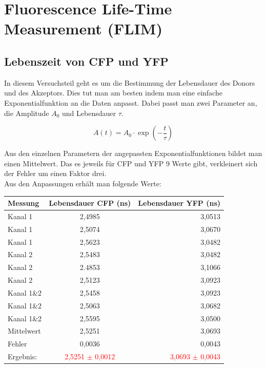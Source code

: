 \section{Fluorescence Life-Time Measurement (FLIM)}

\subsection{Lebenszeit von CFP und YFP}

In diesem Versuchsteil geht es um die Bestimmung der Lebensdauer des Donors und des Akzeptors. Dies tut man am 
besten indem man eine einfache Exponentialfunktion an die Daten anpasst. Dabei passt man zwei Parameter an, die Amplitude $A_0$ und 
Lebensdauer $\tau$.

\begin{equation}
    A(t) = A_0 \cdot \exp(-\frac{t}{\tau})
\end{equation}

Aus den einzelnen Parametern der angepassten Exponentialfunktionen bildet man einen Mittelwert. Das es jeweils für CFP und YFP 9 Werte gibt, 
verkleinert sich der Fehler um einen Faktor drei.\\
Aus den Anpassungen erhält man folgende Werte:\\

\begin{center}
    \centering
    \begin{tabular}{l|cr}
        \toprule
        Messung & Lebensdauer CFP (ns)& Lebensdauer YFP (ns)\\
        \midrule
        Kanal 1 & 2,4985& 3,0513\\
        Kanal 1 & 2,5074& 3,0670\\
        Kanal 1 & 2,5623& 3,0482\\
        \midrule
        Kanal 2 & 2,5483& 3,0482\\
        Kanal 2 & 2.4853& 3,1066\\
        Kanal 2 & 2,5123& 3,0923\\
        \midrule
        Kanal 1\&2 & 2,5458& 3,0923\\
        Kanal 1\&2 & 2,5063& 3,0682\\
        Kanal 1\&2 & 2,5595& 3,0500\\
        \midrule
        Mittelwert & 2,5251& 3,0693\\
        Fehler& 0,0036& 0,0043\\
        Ergebnis:& \textcolor{red}{2,5251 $\pm$ 0,0012}& \textcolor{red}{3,0693 $\pm$ 0,0043}\\
        \bottomrule
    \end{tabular}
\end{center}

